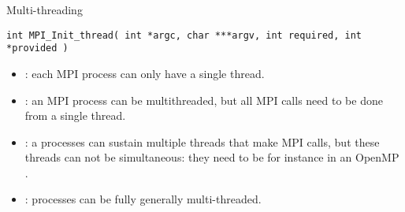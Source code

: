  {Multi-threading}

\begin{verbatim}
int MPI_Init_thread( int *argc, char ***argv, int required, int *provided )
\end{verbatim}

\begin{itemize}
\item {}: each MPI process can only have
  a single thread.
\item {}: an MPI process can be
  multithreaded, but all MPI calls need to be done from a single
  thread.
\item {}: a processes can sustain
  multiple threads that make MPI calls, but these threads can not be
  simultaneous: they need to be for instance in an OpenMP
  .
\item {}: processes can be fully
  generally multi-threaded.
\end{itemize}
